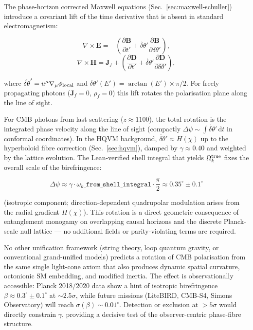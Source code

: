 \documentclass[12pt,a4paper]{article}
\begin{document}
The phase-horizon corrected Maxwell equations (Sec.~\ref{sec:maxwell-schuller}) introduce a covariant lift of the time derivative that is absent in standard electromagnetism:

\[
\nabla \times \mathbf{E} = -\left( \frac{\partial \mathbf{B}}{\partial t'} + \dot{\delta\theta}' \frac{\partial \mathbf{B}}{\partial \delta\theta'} \right),
\]
\[
\nabla \times \mathbf{H} = \mathbf{J}_f + \left( \frac{\partial \mathbf{D}}{\partial t'} + \dot{\delta\theta}' \frac{\partial \mathbf{D}}{\partial \delta\theta'} \right),
\]

where \(\dot{\delta\theta}' = u^\mu \nabla_\mu \phi_{\rm local}\) and \(\delta\theta'(E') = \arctan(E') \times \pi/2\). For freely propagating photons (\(\mathbf{J}_f = 0\), \(\rho_f = 0\)) this lift rotates the polarisation plane along the line of sight.

For CMB photons from last scattering (\(z \approx 1100\)), the total rotation is the integrated phase velocity along the line of sight (compactly \(\Delta\psi \sim \int \dot{\delta\theta}'\,\mathrm{d}t\) in conformal coordinates). In the HQVM background, \(\dot{\delta\theta}' \approx H(\chi)\) up to the hyperboloid fibre correction (Sec.~\ref{sec:hqvm}), damped by \(\gamma \approx 0.40\) and weighted by the lattice evolution. The Lean-verified shell integral that yields \(\Omega_k^{\rm true}\) \citep{hqiv-lean} fixes the overall scale of the birefringence:

\[
\Delta\psi \approx \gamma \cdot \omega_k\texttt{\_from\_shell\_integral} \cdot \frac{\pi}{2} \approx 0.35^\circ \pm 0.1^\circ
\]

(isotropic component; direction-dependent quadrupolar modulation arises from the radial gradient \(H(\chi)\)). This rotation is a direct geometric consequence of entanglement monogamy on overlapping causal horizons and the discrete Planck-scale null lattice — no additional fields or parity-violating terms are required.

No other unification framework (string theory, loop quantum gravity, or conventional grand-unified models) predicts a rotation of CMB polarisation from the same single light-cone axiom that also produces dynamic spatial curvature, octonionic SM embedding, and modified inertia. The effect is observationally accessible: Planck 2018/2020 data show a hint of isotropic birefringence \(\beta \approx 0.3^\circ \pm 0.1^\circ\) at \(\sim 2.5\sigma\), while future missions (LiteBIRD, CMB-S4, Simons Observatory) will reach \(\sigma(\beta) \sim 0.01^\circ\). Detection or exclusion at \(>5\sigma\) would directly constrain \(\gamma\), providing a decisive test of the observer-centric phase-fibre structure.
\end{document}

